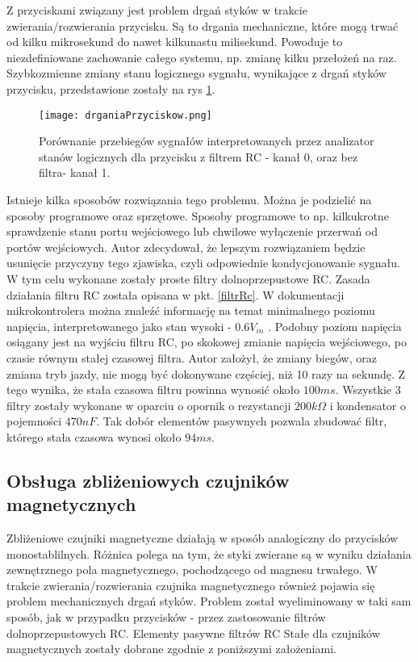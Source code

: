 Z przyciskami związany jest problem drgań styków w trakcie zwierania/rozwierania przycisku. Są to drgania mechaniczne, które mogą trwać od kilku mikrosekund do nawet kilkunastu milisekund. Powoduje to niezdefiniowane zachowanie całego systemu, np. zmianę kilku przełożeń na raz. Szybkozmienne zmiany stanu logicznego sygnału, wynikające z drgań styków przycisku, przedstawione zostały na rys \ref{fig:drganiaPrzyciskow}.
\begin{figure}[h]
    \centering
    \texttt{[image: drganiaPrzyciskow.png]}
    \caption{Porównanie przebiegów sygnałów interpretowanych przez analizator stanów logicznych dla przycisku z filtrem RC - kanał 0, oraz bez filtra- kanał 1.}
    \label{fig:drganiaPrzyciskow}
\end{figure}
Istnieje kilka sposobów rozwiązania tego problemu. Można je podzielić na sposoby programowe oraz sprzętowe. Sposoby programowe to np. kilkukrotne sprawdzenie stanu portu wejściowego lub chwilowe wyłączenie przerwań od portów wejściowych. Autor zdecydował, że lepszym rozwiązaniem będzie usunięcie przyczyny tego zjawiska, czyli odpowiednie kondycjonowanie sygnału. W tym celu wykonane zostały proste filtry dolnoprzepustowe RC. Zasada działania filtru RC została opisana w pkt. \ref{filtrRc}. W dokumentacji mikrokontrolera można znaleźć informację na temat minimalnego poziomu napięcia, interpretowanego jako stan wysoki - $0.6V_{in}$ \cite{tiva}. Podobny poziom napięcia osiągany jest na wyjściu filtru RC, po skokowej zmianie napięcia wejściowego, po czasie równym stałej czasowej filtra. Autor założył, że zmiany biegów, oraz zmiana tryb jazdy, nie mogą być dokonywane częściej, niż 10 razy na sekundę. Z tego wynika, że stała czasowa filtru powinna wynosić około $100ms$. Wszystkie 3 filtry zostały wykonane w oparciu o opornik o rezystancji $200k\Omega$ i kondensator o pojemności 470$nF$. Tak dobór elementów pasywnych pozwala zbudować filtr, którego stała czasowa wynosi około $94ms$.
\subsection{Obsługa zbliżeniowych czujników magnetycznych}
Zbliżeniowe czujniki magnetyczne działają w sposób analogiczny do przycisków monostablilnych. Różnica polega na tym, że styki zwierane są w wyniku działania zewnętrznego pola magnetycznego, pochodzącego od magnesu trwałego. W trakcie zwierania/rozwierania czujnika magnetycznego również pojawia się problem mechanicznych drgań styków. Problem został wyeliminowany w taki sam sposób, jak w przypadku przycisków - przez zastosowanie filtrów dolnoprzepustowych RC. Elementy pasywne filtrów RC Stałe dla czujników magnetycznych zostały dobrane zgodnie z poniższymi założeniami.


